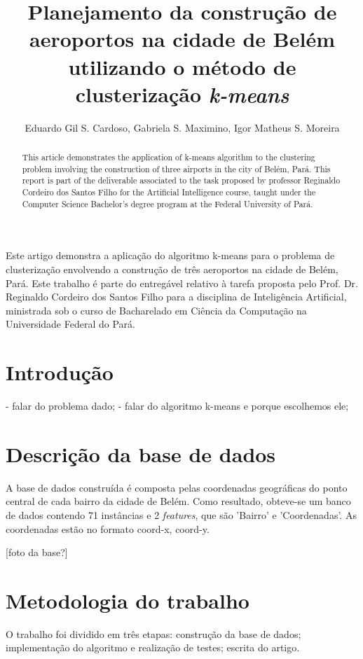 \documentclass[12pt]{article}
\title{Planejamento da construção de aeroportos na cidade de Belém utilizando o método de clusterização \textit{k-means}}
\author{Eduardo Gil S. Cardoso\inst{1}, Gabriela S. Maximino\inst{1}, Igor Matheus S. Moreira\inst{1} }
\begin{document}
 

\maketitle

\begin{abstract}
  This article demonstrates the application of k-means algorithm to the clustering problem involving the construction of three airports in the city of Belém, Pará. This report is part of the deliverable associated to the task proposed by professor Reginaldo Cordeiro dos Santos Filho for the Artificial Intelligence course, taught under the Computer Science Bachelor's degree program at the Federal University of Pará.
\end{abstract}
     
\begin{resumo} 
  Este artigo demonstra a aplicação do algoritmo k-means para o problema de clusterização envolvendo a construção de três aeroportos na cidade de Belém, Pará. Este trabalho é parte do entregável relativo à tarefa proposta pelo Prof. Dr. Reginaldo Cordeiro dos Santos Filho para a disciplina de Inteligência Artificial, ministrada sob o curso de Bacharelado em Ciência da Computação na Universidade Federal do Pará.
\end{resumo}


\section{Introdução}
- falar do problema dado;
- falar do algoritmo k-means e porque escolhemos ele;



\section{Descrição da base de dados}
A base de dados construída é composta pelas coordenadas geográficas do ponto central de cada bairro da cidade de Belém. Como resultado, obteve-se um banco de dados contendo 71 instâncias e 2 \textit{features}, que são 'Bairro' e 'Coordenadas'. As coordenadas estão no formato coord-x, coord-y.



[foto da base?]

\section{Metodologia do trabalho}
O trabalho foi dividido em três etapas: construção da base de dados; implementação do algoritmo e realização de testes; escrita do artigo.
\end{document}
